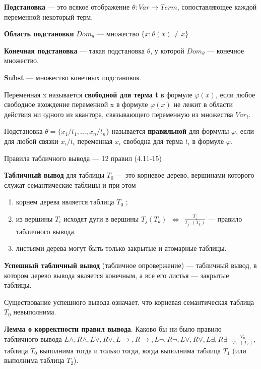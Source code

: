 \documentclass[a4paper,12pt]{article}
\begin{document}

\textbf{Подстановка} --- это всякое отображение $\theta : Var \rightarrow Term$, сопоставляющее каждой переменной некоторый терм.

\textbf{Область подстановки} $Dom_\theta$ --- множество $\{x : \theta(x) \neq x\}$

\textbf{Конечная подстановка} --- такая подстановка $\theta$, у которой $Dom_\theta$ --- конечное множество.

\textbf{Subst} --- множество конечных подстановок.

Переменная x называется \textbf{свободной для терма t} в формуле $\varphi(x)$, если любое свободное вхождение переменной x в формуле $\varphi(x)$ не лежит в области действия ни одного из квантора, связывающего переменную из множества $Var_t$.

Подстановка $\theta = \{ x_1/t_1 , \dots , x_n/t_n \}$ называется \textbf{правильной} для формулы $\varphi$, если для любой связки $x_i/t_i$ переменная $x_i$ свободна для терма $t_i$ в формуле $\varphi$.

Правила табличного вывода --- 12 правил (4.11-15)

\textbf{Табличный вывод} для таблицы $T_0$ --- это корневое дерево, вершинами которого служат семантические таблицы и при этом
\begin{enumerate}
 \item корнем дерева является таблица $T_0$ ;
 \item из вершины $T_i$ исходят дуги в вершины $T_j (T_k)~~\Leftrightarrow~~\frac{T_i}{T_j , (T_k)}$ --- правило табличного вывода.
 \item листьями дерева могут быть только закрытые и атомарные таблицы.
\end{enumerate}

\textbf{Успешный табличный вывод} (табличное опровержение) --- табличный вывод, в котором дерево вывода является конечным, а все его листья ---  закрытые таблицы.

Существование успешного вывода означает, что корневая семантическая таблица $T_0$ невыполнима.

\textbf{Лемма о корректности правил вывода}. Каково бы ни было правило табличного вывода $L\wedge, R\wedge, L\vee, R\vee, L\rightarrow, R\rightarrow, L\neg, R\neg, L\forall, R\forall, L\exists, R\exists~~~\frac{T_0}{T_1, (T_2)}$, таблица $T_0$ выполнима тогда и только тогда, когда выполнима таблица $T_1$ (или выполнима таблица $T_2$).
\end{document}
